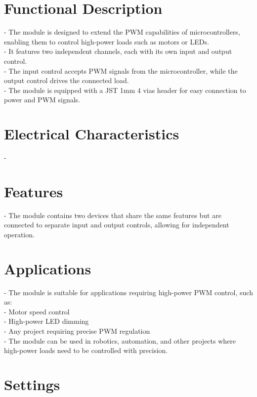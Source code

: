 \documentclass[10pt]{article}
\begin{document}
\section*{Functional Description}
- The module is designed to extend the PWM capabilities of microcontrollers, enabling them to control high-power loads such as motors or LEDs.\\ 
- It features two independent channels, each with its own input and output control.\\ 
- The input control accepts PWM signals from the microcontroller, while the output control drives the connected load.\\ 
- The module is equipped with a JST 1mm 4 vias header for easy connection to power and PWM signals.\\ 

\section*{Electrical Characteristics}
-\\ 

\section*{Features}
- The module contains two devices that share the same features but are connected to separate input and output controls, allowing for independent operation.\\ 



\section*{Applications}
- The module is suitable for applications requiring high-power PWM control, such as:\\ 
- Motor speed control\\ 
- High-power LED dimming\\ 
- Any project requiring precise PWM regulation\\ 
- The module can be used in robotics, automation, and other projects where high-power loads need to be controlled with precision.\\ 

\vspace{1em}

\section*{Settings}
\end{document}
